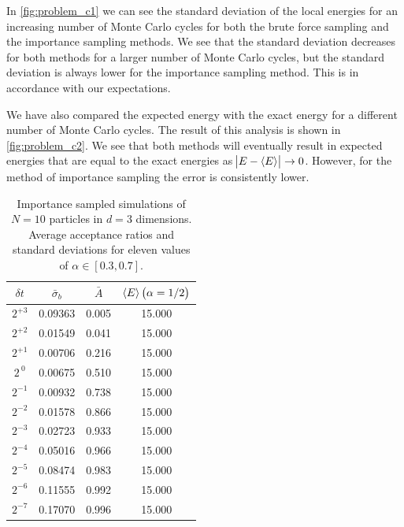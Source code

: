 \documentclass[
    a4paper, aps, twocolumn, floatfix, superscriptaddress,
    nofootinbib]{revtex4-1}
\newcommand{\1}{\mathds{1}}
\begin{document}
            In \autoref{fig:problem_c1} we can see the standard deviation of the
            local energies for an increasing number of Monte Carlo cycles for
            both the brute force sampling and the importance sampling methods.
            We see that the standard deviation decreases for both methods for a
            larger number of Monte Carlo cycles, but the standard deviation is
            always lower for the importance sampling method. This is in
            accordance with our expectations.

            We have also compared the expected energy with the exact energy for
            a different number of Monte Carlo cycles. The result of this
            analysis is shown in \autoref{fig:problem_c2}. We see that both
            methods will eventually result in expected energies that are equal
            to the exact energies as $\abs{E - \expval{E}} \to 0$. However, for
            the method of importance sampling the error is consistently lower.

            \begin{table}
                \caption{Importance sampled simulations of $N=10$ particles in
                $d=3$ dimensions. Average acceptance ratios and standard
                deviations for eleven values of $\alpha \in [0.3, 0.7]$.}
                \centering
                    \begin{ruledtabular}
                        \begin{tabular}{cccc}
                            $\delta t$ & $\bar{\sigma}_b$ & $\bar{A}$
                            & $\expval{E}\left(\alpha = 1/2\right)$ \\
                            \hline
                            $2^{+3}$ & 0.09363 & 0.005 & 15.000 \\
                            $2^{+2}$ & 0.01549  & 0.041 & 15.000 \\
                            $2^{+1}$ & 0.00706 & 0.216 & 15.000 \\
                            $2^{\ 0}$ & 0.00675 & 0.510 & 15.000 \\
                            $2^{-1}$ & 0.00932 & 0.738 & 15.000 \\
                            $2^{-2}$ & 0.01578 & 0.866 & 15.000 \\
                            $2^{-3}$ & 0.02723 & 0.933 & 15.000 \\
                            $2^{-4}$ & 0.05016 & 0.966 & 15.000 \\
                            $2^{-5}$ & 0.08474 & 0.983 & 15.000 \\
                            $2^{-6}$ & 0.11555 & 0.992 & 15.000 \\
                            $2^{-7}$ & 0.17070 & 0.996 & 15.000 \\
                        \end{tabular}
                    \end{ruledtabular}
                    \label{tab:imp_time_step}
            \end{table}
\end{document}
